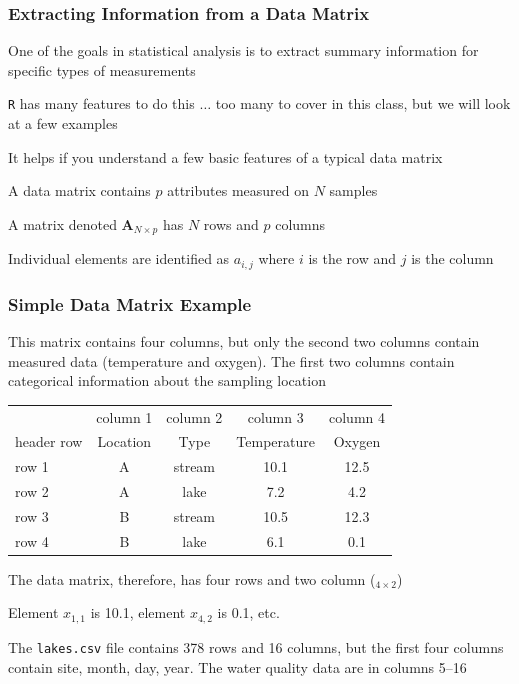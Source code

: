 \documentclass[10pt]{beamer}
\begin{document}
\begin{frame}[fragile]
\frametitle{Extracting Information from a Data Matrix}
\bi
\item One of the goals in statistical analysis is to extract
  summary information for specific types of measurements

\item {\color{red} \tt R} has many features to do this $\ldots$ too many to
  cover in this class, but we will look at a few
  examples
\item It helps if you understand a few basic features of a typical
  data matrix

\bi
\item A data matrix contains {\color{blue}$p$}
attributes measured on {\color{blue}$N$} samples

\item A matrix denoted {\color{blue} {\bf A}$_{N \times p}$} has
  {\color{blue}$N$} rows and {\color{blue}$p$} columns

\item Individual elements are identified as {\color{blue}$a_{i,j}$}
where {\color{blue}$i$} is the row and {\color{blue}$j$} is the column
\ei

\ei
\end{frame}


\begin{frame}
\frametitle{Simple Data Matrix Example}

\bi
\item This matrix contains four columns, but only the second two
  columns contain measured data (temperature and oxygen). The first
  two columns contain categorical information about the sampling
  location

{\small
\begin{center}
\begin{tabular}{|l|c|c|c|c|} \hline
           & column 1 & column 2 & column 3 & column 4 \\ \cline{2-5}
header row & Location & Type   & Temperature	& Oxygen \\ \hline
row 1      & A        & stream & 10.1		& 12.5 \\  \hline
row 2      & A        & lake   & 7.2 		& 4.2 \\ \hline
row 3      & B        & stream & 10.5		& 12.3\\ \hline
row 4      & B        & lake   & 6.1 		& 0.1 \\ \hline
\end{tabular}
\end{center}
}

\item The data matrix, therefore, has four rows and two column
  ({\color{blue}{\bf X}$_{4 \times 2}$})
	
\item Element {\color{blue}$x_{1,1}$} is 10.1, element {\color{blue}$x_{4,2}$}
is 0.1, etc.

\item The {\color{red} \tt lakes.csv} file contains 378 rows
  and 16 columns, but the first four columns contain site, month, day,
  year.  The water quality data are in columns 5--16
\ei
\end{frame}
\end{document}
